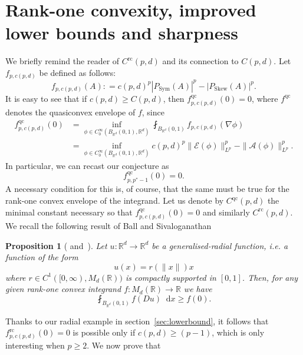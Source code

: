 \documentclass[11pt, a4paper]{amsart}
\newtheorem{proposition}{Proposition}[section]
\theoremstyle{definition}
\theoremstyle{remark}
\newcommand{\R}{\mathbb{R}}
\newcommand*\diff{\mathop{}\!\mathrm{d}}
\begin{document}
\section{Rank-one convexity,
improved lower bounds and sharpness}
\label{sec:calcvar}
We briefly remind the reader of $C^{\mathrm{rc}}(p,d)$
and its connection to $C(p,d)$.
Let $f_{p,c(p,d)}$ be defined as follows:
\begin{equation*}
f_{p,c(p,d)}(A)\mathrel{:}=
c(p,d)^p|P_{\mathrm{Sym}}(A)|^p
-|P_{\mathrm{Skew}}(A)|^p.
\end{equation*}
It is easy
to see that if $c(p,d)\ge C(p,d)$,
then $f_{p,c(p,d)}^{\mathrm{qc}}(0)=0$,
where $f^{\mathrm{qc}}$
denotes the quasiconvex
envelope of $f$, since
\begin{align*}
f^{\mathrm{qc}}_{p,c(p,d)}(0)
&=\inf_{\phi \in C^{\infty}_0(B_{\R^d}(0,1),\R^d)} 
\fint_{B_{\R^d}(0,1)} f_{p,c(p,d)}(\nabla \phi)
\\&=\inf_{\phi\in C^\infty_0(B_{\R^d}(0,1),\R^d)}
c(p,d)^p\|\mathcal E(\phi)\|_{L^p}^p-
\|\mathcal A (\phi)\|_{L^p}^p.
\end{align*} 
In particular, we can recast our conjecture as
\begin{equation*}
f_{p,p^*-1}^{\mathrm{qc}}(0)=0.
\end{equation*}
A necessary condition for this is, of course, that the
same must be true for the
rank-one convex envelope of the integrand.
Let us denote by $C^{\mathrm{qc}}(p,d)$
the minimal constant
necessary so that $f^{\mathrm{qc}}_{p,c(p,d)}(0)=0$
and similarly $C^{\mathrm{rc}}(p,d)$.
We recall the following result of
Ball and Sivaloganathan
\begin{proposition}[{\cite[Proposition 3.4]{Ball}
    and~\cite[Proposition 2.4]{Sivaloganathan}}]
\label{prop:radial}
Let $u\colon \R^d\to \R^d$ be
a generalised-radial function,
i.e. a function of the form
\begin{equation*}
u(x)=r(\|x\|)x
\end{equation*}
where $r\in C^1([0,\infty), M_d(\R))$
is compactly supported in $[0,1]$. Then, for any given
rank-one convex integrand $f\colon M_d(\R)\to \R$
we have
\begin{equation*}
\fint_{B_{\R^d}(0,1)} f(Du)\diff x\ge f(0).
\end{equation*}
\end{proposition}
Thanks to our radial example
in section~\ref{sec:lowerbound},
it follows that $f_{p,c(p,d)}^{\mathrm{rc}}(0)=0$
is possible
only if $c(p,d)\ge (p-1)$,
which is only interesting when $p\ge 2$.
We now prove that
\end{document}
